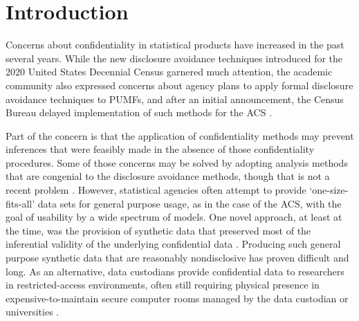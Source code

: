 \documentclass[inline]{hdsr}
\begin{document}
\section*{Introduction}
\label{intro}



Concerns about confidentiality in statistical products have increased in the past several years. While the new disclosure avoidance techniques introduced for the 2020 United States Decennial Census \citep{abowd_2020_2022} garnered much attention, the academic community also expressed concerns about agency plans to apply formal disclosure avoidance techniques to \acp{PUMF}, and after an initial announcement, the Census Bureau delayed implementation of such methods for the \ac{ACS} \citep{daily_disclosure_2022}. 

Part of the concern is that the application of confidentiality methods may prevent inferences that were feasibly made in the absence of those confidentiality procedures. Some of those concerns may be solved by adopting analysis methods that are congenial \citep{meng_multiple-imputation_1994} to the disclosure avoidance methods, though that is not a recent problem \citep{AbowdSchmutte_BPEA2015}. However, statistical agencies often attempt to provide `one-size-fits-all' data sets for general purpose usage, as in the case of the \ac{ACS}, with the goal of  usability by a wide spectrum of models. One novel approach, at least at the time, was the provision of synthetic data that preserved most of the inferential validity of the underlying confidential data \citep{rubin_discussion_1993,little_statistical_1993,reiter_synthetic_2023,raghunathan_synthetic_2021}. Producing such general purpose synthetic data that are reasonably nondisclosive has proven difficult and long. As an alternative, data custodians provide confidential data to researchers in restricted-access environments, often still requiring physical presence in expensive-to-maintain secure computer rooms managed by the data custodian or universities \citep{weinbergAccessMethodsUnited2007,vilhuberProtectingConfidentialData2024}.  
\end{document}
